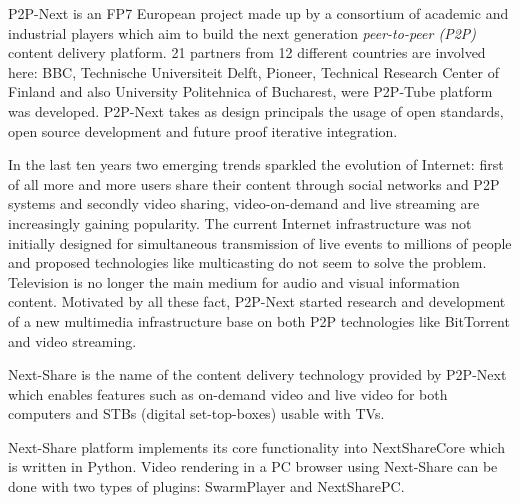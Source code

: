 P2P-Next is an FP7 European project made up by a consortium of academic and industrial players which aim to build the next generation \textit{peer-to-peer (P2P)} content delivery platform. 21 partners from 12 different countries are involved here: BBC, Technische Universiteit Delft, Pioneer, Technical Research Center of Finland and also University Politehnica of Bucharest, were P2P-Tube platform was developed. P2P-Next takes as design principals the usage of open standards, open source development and future proof iterative integration.

In the last ten years two emerging trends sparkled the evolution of Internet: first of all more and more users share their content through social networks and P2P systems and secondly video sharing, video-on-demand and live streaming are increasingly gaining popularity. The current Internet infrastructure was not initially designed for simultaneous transmission of live events to millions of people and proposed technologies like multicasting do not seem to solve the problem. Television is no longer the main medium for audio and visual information content. Motivated by all these fact, P2P-Next started research and development of a new multimedia infrastructure base on both P2P technologies like BitTorrent and video streaming.

Next-Share is the name of the content delivery technology provided by P2P-Next which enables features such as on-demand video and live video for both computers and STBs (digital set-top-boxes) usable with TVs.

Next-Share platform implements its core functionality into NextShareCore which is written in Python. Video rendering in a PC browser using Next-Share can be done with two types of plugins: SwarmPlayer and NextSharePC.

